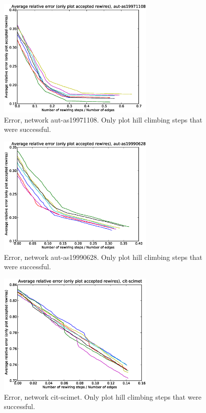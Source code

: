 \begin{figure}[p]
\centering
\includegraphics[width=3in]{Figures/acceptedOnly-aut-as19971108.eps}
\caption{Error, network aut-as19971108.  Only plot hill climbing steps that were successful.}
\label{fig:errors-aut-as19971108}
\end{figure}

\begin{figure}[p]
\centering
\includegraphics[width=3in]{Figures/acceptedOnly-aut-as19990628.eps}
\caption{Error, network aut-as19990628.  Only plot hill climbing steps that were successful.}
\label{fig:errors-aut-as19990628}
\end{figure}

\begin{figure}[p]
\centering
\includegraphics[width=3in]{Figures/acceptedOnly-cit-scimet.eps}
\caption{Error, network cit-scimet.  Only plot hill climbing steps that were successful.}
\label{fig:errors-cit-scimet}
\end{figure}

